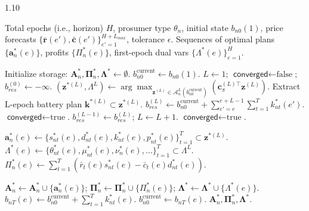 \documentclass[12pt, notitlepage]{article}
\begin{document}
\begin{algorithm}[h!]
\caption{Rolling-Horizon MPC for Prosumer Optimization}
\label{alg:full_mpc}
\begin{spacing}{1.10} %
\begin{algorithmic}[1]
\Require Total epochs (i.e., horizon) $H$, prosumer type $\theta_n$, initial state $b_{n0}(1)$, price forecasts $\{\bar{\mathbf{r}}(e'), \bar{\mathbf{c}}(e')\}_{e'=1}^{H+L_{max}}$, tolerance $\epsilon$.
\Ensure Sequences of optimal plans $\{\boldsymbol{a}_n^*(e)\}$, profits $\{\Pi_n^*(e)\}$, first-epoch dual vars $\{\Lambda^*(e)\}_{e=1}^H$.

\State Initialize storage: $\boldsymbol{A}_n^*, \boldsymbol{\Pi}_n^*, \boldsymbol{\Lambda}^* \gets \emptyset$.
\State $b_{n0}^{\text{current}} \gets b_{n0}(1)$.
 
    \State $L \gets 1$; $\textsf{converged} \gets \text{false}$; $b_{res}^{(0)} \gets -\infty$. 
        \State $(\mathbf{z}^{*(L)}, \Lambda^L) \gets \arg\max_{\mathbf{z}^{(L)} \in \mathcal{A}_n^L(b_{n0}^{\text{current}})} \left( \mathbf{c}_{\pi}^{(L)\top} \mathbf{z}^{(L)}  \right)$. 
        \State Extract L-epoch battery plan $\mathbf{k}^{*(L)} \subset \mathbf{z}^{*(L)}$.
        \State $b_{res}^{(L)} \gets b_{n0}^{\text{current}} + \sum_{e'=e}^{e+L-1} \sum_{t=1}^T k_{nt}^*(e') $. 
            \State $\textsf{converged} \gets \text{true}$.
        \Else
            \State $b_{res}^{(L-1)} \gets b_{res}^{(L)}$; $L \gets L+1$.
             $\textsf{converged} \gets \text{true}$. \EndIf
        \EndIf
    \EndWhile

    \Statex {}
    \State $\boldsymbol{a}_n^*(e) \gets \{s_{nt}^*(e), d_{nt}^*(e), k_{nt}^*(e), p_{nt}^*(e)\}_{t=1}^T \subset \mathbf{z}^{*(L)}$.
    \State $\Lambda^*(e) \gets \{\theta_{nt}^*(e), \mu_{nt}^*(e), \nu_n^*(e), \dots \}_{t=1}^T \subset \Lambda^L$.
    \State $\Pi_n^*(e) \gets \sum_{t=1}^T (\bar{r}_t(e)s_{nt}^*(e) - \bar{c}_t(e)d_{nt}^*(e)) $.

    \Statex {}
    \State $\boldsymbol{A}_n^* \gets \boldsymbol{A}_n^* \cup \{\boldsymbol{a}_n^*(e)\}$; $\boldsymbol{\Pi}_n^* \gets \boldsymbol{\Pi}_n^* \cup \{\Pi_n^*(e)\}$; $\boldsymbol{\Lambda}^* \gets \boldsymbol{\Lambda}^* \cup \{\Lambda^*(e)\}$.
    \State $b_{nT}(e) \gets b_{n0}^{\text{current}} + \sum_{t=1}^T k_{nt}^*(e) $.
    \State $b_{n0}^{\text{current}} \gets b_{nT}(e)$. 
\EndFor
\State \Return $\boldsymbol{A}_n^*, \boldsymbol{\Pi}_n^*, \boldsymbol{\Lambda}^*$.
\end{algorithmic}
\end{spacing}
\end{algorithm}
\end{document}

